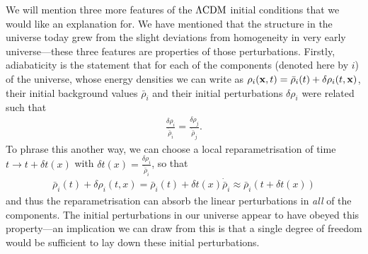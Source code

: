 

    We will mention three more features of the $\Lambda\text{CDM}$ initial conditions that we would
    like an explanation for. We have mentioned that the structure in the universe today
    grew from the slight deviations from homogeneity in very early universe---these three
    features are properties of those perturbations.
    Firstly, adiabaticity is the statement that for each of the components (denoted here by $i$) of the universe,
    whose energy densities we can write as
    $\rho_i(\mathbf{x},t) = \bar{\rho}_i(t)+\delta\rho_i(t,\mathbf{x})$, their
    initial background values $\bar{\rho}_i$ and their
    initial perturbations $\delta\rho_i$ were related such that
    \begin{align}
        \frac{\delta\rho_i}{\dot{\bar{\rho}}_i} = \frac{\delta\rho_j}{\dot{\bar{\rho}}_j}.
    \end{align}
    To phrase this another way, we can choose a local reparametrisation of time $t\rightarrow t+\delta t(x)$
    with $\delta t(x)=\frac{\delta\rho_i}{\dot{\bar{\rho}}_i}$, so that
    \begin{align}
        \bar{\rho}_i(t)+\delta \rho_i(t,x) = \bar{\rho}_i(t)+\delta t(x)\dot{\bar{\rho}}_i
        \approx \bar{\rho}_i(t+\delta t(x))
    \end{align}
    and thus the reparametrisation can absorb the linear perturbations in
    \textit{all} of the components.
    The initial perturbations in our universe appear to have obeyed this property---an
    implication we can draw from this is that a single degree of freedom
    would be sufficient to lay down these initial perturbations.


